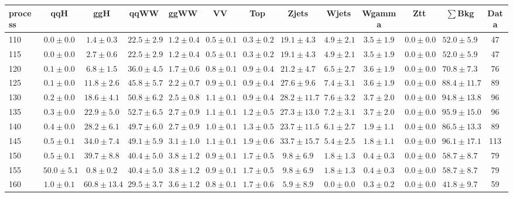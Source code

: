 \begin{table}
{%
 \tiny
 \begin{center}
 \begin{tabular}{l | c c | c c c c c c c c  | c c}
 \hline
 process & qqH & ggH & qqWW & ggWW & VV & Top & Zjets & Wjets & Wgamma & Ztt & $\sum$Bkg & Data \\
 \hline
110 & $0.0\pm0.0$ & $1.4\pm0.3$ & $22.5\pm2.9$ & $1.2\pm0.4$ & $0.5\pm0.1$ & $0.3\pm0.2$ & $19.1\pm4.3$ & $4.9\pm2.1$ & $3.5\pm1.9$ & $0.0\pm0.0$ & $52.0\pm5.9$ & 47 \\
115 & $0.0\pm0.0$ & $2.7\pm0.6$ & $22.5\pm2.9$ & $1.2\pm0.4$ & $0.5\pm0.1$ & $0.3\pm0.2$ & $19.1\pm4.3$ & $4.9\pm2.1$ & $3.5\pm1.9$ & $0.0\pm0.0$ & $52.0\pm5.9$ & 47 \\
120 & $0.1\pm0.0$ & $6.8\pm1.5$ & $36.0\pm4.5$ & $1.7\pm0.6$ & $0.8\pm0.1$ & $0.9\pm0.4$ & $21.2\pm4.7$ & $6.5\pm2.7$ & $3.6\pm1.9$ & $0.0\pm0.0$ & $70.8\pm7.3$ & 76 \\
125 & $0.1\pm0.0$ & $11.8\pm2.6$ & $45.8\pm5.7$ & $2.2\pm0.7$ & $0.9\pm0.1$ & $0.9\pm0.4$ & $27.6\pm9.6$ & $7.4\pm3.1$ & $3.6\pm1.9$ & $0.0\pm0.0$ & $88.4\pm11.7$ & 89 \\
130 & $0.2\pm0.0$ & $18.6\pm4.1$ & $50.8\pm6.2$ & $2.5\pm0.8$ & $1.1\pm0.1$ & $0.9\pm0.4$ & $28.2\pm11.7$ & $7.6\pm3.2$ & $3.7\pm2.0$ & $0.0\pm0.0$ & $94.8\pm13.8$ & 96 \\
135 & $0.3\pm0.0$ & $22.9\pm5.0$ & $52.7\pm6.5$ & $2.7\pm0.9$ & $1.1\pm0.1$ & $1.2\pm0.5$ & $27.3\pm13.0$ & $7.2\pm3.1$ & $3.7\pm2.0$ & $0.0\pm0.0$ & $95.9\pm15.0$ & 96 \\
140 & $0.4\pm0.0$ & $28.2\pm6.1$ & $49.7\pm6.0$ & $2.7\pm0.9$ & $1.0\pm0.1$ & $1.3\pm0.5$ & $23.7\pm11.5$ & $6.1\pm2.7$ & $1.9\pm1.1$ & $0.0\pm0.0$ & $86.5\pm13.3$ & 89 \\
145 & $0.5\pm0.1$ & $34.0\pm7.4$ & $49.1\pm5.9$ & $3.1\pm1.0$ & $1.1\pm0.1$ & $1.9\pm0.6$ & $33.7\pm15.7$ & $5.4\pm2.5$ & $1.8\pm1.1$ & $0.0\pm0.0$ & $96.1\pm17.1$ & 113 \\
150 & $0.5\pm0.1$ & $39.7\pm8.8$ & $40.4\pm5.0$ & $3.8\pm1.2$ & $0.9\pm0.1$ & $1.7\pm0.5$ & $9.8\pm6.9$ & $1.8\pm1.3$ & $0.4\pm0.3$ & $0.0\pm0.0$ & $58.7\pm8.7$ & 79 \\
155 & $50.0\pm5.1$ & $0.8\pm0.2$ & $40.4\pm5.0$ & $3.8\pm1.2$ & $0.9\pm0.1$ & $1.7\pm0.5$ & $9.8\pm6.9$ & $1.8\pm1.3$ & $0.4\pm0.3$ & $0.0\pm0.0$ & $58.7\pm8.7$ & 79 \\
160 & $1.0\pm0.1$ & $60.8\pm13.4$ & $29.5\pm3.7$ & $3.6\pm1.2$ & $0.8\pm0.1$ & $1.7\pm0.6$ & $5.9\pm8.9$ & $0.0\pm0.0$ & $0.3\pm0.2$ & $0.0\pm0.0$ & $41.8\pm9.7$ & 59 \\

\end{tabular}
\end{center}}
\end{table}
